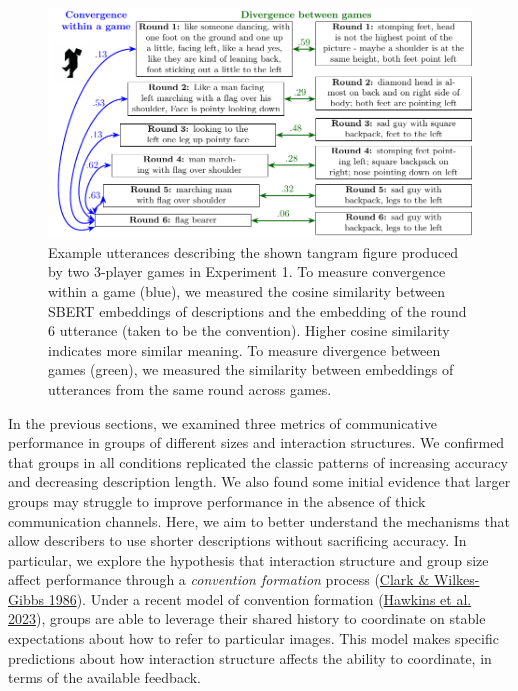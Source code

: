 \documentclass[
  english,
]{article}
\begin{document}
\begin{figure}[t!]

{\centering \includegraphics[width=1\linewidth]{sbert} 

}

\caption{Example utterances describing the shown tangram figure produced by two 3-player games in Experiment 1. To measure convergence within a game (blue), we measured the cosine similarity between SBERT embeddings of descriptions and the embedding of the round 6 utterance (taken to be the convention). Higher cosine similarity indicates more similar meaning. To measure divergence between games (green), we measured the similarity between embeddings of utterances from the same round across games.}\label{fig:sbert-diagram}
\end{figure}

In the previous sections, we examined three metrics of communicative performance in groups of different sizes and interaction structures.
We confirmed that groups in all conditions replicated the classic patterns of increasing accuracy and decreasing description length.
We also found some initial evidence that larger groups may struggle to improve performance in the absence of thick communication channels.
Here, we aim to better understand the mechanisms that allow describers to use shorter descriptions without sacrificing accuracy.
In particular, we explore the hypothesis that interaction structure and group size affect performance through a \emph{convention formation} process (\protect\hyperlink{ref-clark1986}{Clark \& Wilkes-Gibbs 1986}).
Under a recent model of convention formation (\protect\hyperlink{ref-hawkins2023partners}{Hawkins et al. 2023}), groups are able to leverage their shared history to coordinate on stable expectations about how to refer to particular images.
This model makes specific predictions about how interaction structure affects the ability to coordinate, in terms of the available feedback.
\end{document}
